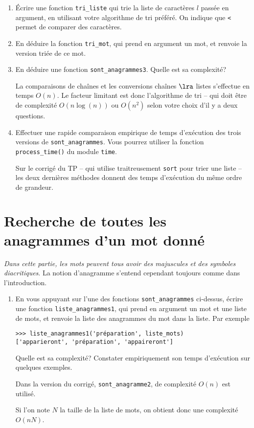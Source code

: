 \documentclass[10pt]{article}
\begin{document}
\begin{enumerate}[resume]
\item Écrire une fonction \verb+tri_liste+ qui trie la liste de
  caractères $l$ passée en argument, en utilisant votre algorithme de
  tri préféré. On indique que \verb+<+ permet de comparer des
  caractères.
\item En déduire la fonction \verb+tri_mot+, qui prend en argument un
  mot, et renvoie la version triée de ce mot.
\item En déduire une fonction \verb+sont_anagrammes3+. Quelle est sa complexité?

  \begin{correction}
    La comparaisons de chaînes et les conversions chaînes $\lra$ listes s'effectue en temps $O(n)$. Le facteur limitant est donc l'algorithme de tri -- qui doit être de complexité $O(n\log(n))$ ou $O(n^2)$ selon votre choix d'il y a deux questions. 
  \end{correction}
\item Effectuer une rapide comparaison empirique de temps d'exécution des trois versions de \verb+sont_anagrammes+. Vous pourrez utiliser la fonction \verb+process_time()+ du module \verb+time+.

  \begin{correction}
    Sur le corrigé du TP -- qui utilise traitreusement \verb+sort+ pour trier une liste -- les deux dernières méthodes donnent des temps d'exécution du même ordre de grandeur. 
  \end{correction}
  
\end{enumerate}

\section{Recherche de toutes les anagrammes d'un mot donné}\label{tousanagrammes}

\emph{Dans cette partie, les mots peuvent tous avoir des majuscules et des symboles diacritiques}. La notion d'anagramme s'entend cependant toujours comme dans l'introduction. 

\begin{enumerate}[resume]
\item En vous appuyant sur l'une des fonctions \verb+sont_anagrammes+
  ci-dessus, écrire une fonction \verb+liste_anagrammes1+, qui prend
  en argument un mot et une liste de mots, et renvoie la liste des
  anagrammes du mot dans la liste. Par exemple
  \begin{verbatim}
>>> liste_anagrammes1('préparation', liste_mots)
['apparieront', 'préparation', 'appaireront']
\end{verbatim}
  Quelle est sa complexité? Constater empiriquement son temps d'exécution sur quelques exemples. 

  \begin{correction}
    Dans la version du corrigé, \verb+sont_anagramme2+, de complexité
    $O(n)$ est utilisé.

    Si l'on note $N$ la taille de la liste de mots, on obtient donc
    une complexité $O(nN)$.
  \end{correction}  
\end{enumerate}
\end{document}

